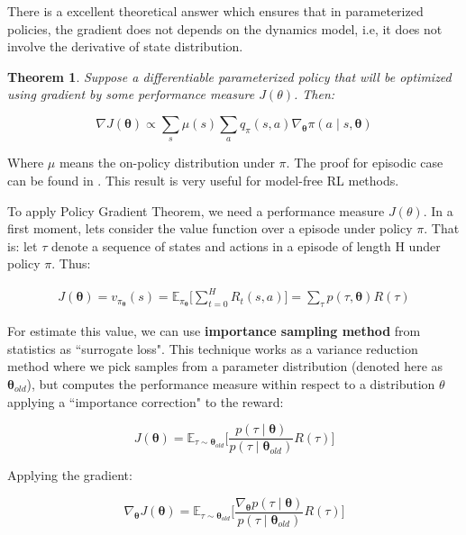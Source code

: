 There is a excellent theoretical answer which ensures that in parameterized policies, the gradient does not depends on the dynamics model, i.e, it does not involve the derivative of state distribution.

\newtheorem{pg}{Theorem}
\begin{pg}
	Suppose a differentiable parameterized policy that will be optimized using gradient by some performance measure $J(\theta)$. Then:
	
	\begin{equation}
	\nabla J(\boldsymbol{\theta}) \propto \sum_{s}\mu(s)\sum_{a} q_{\pi}(s, a)\nabla_{\boldsymbol{\theta}} \pi(a \mid s, \boldsymbol{\theta})
	\end{equation}
\end{pg}

Where $\mu$ means the on-policy distribution under $\pi$. The proof for episodic case can be found in \cite{sutton1998rli}. This result is very useful for model-free RL methods.

To apply Policy Gradient Theorem, we need a performance measure $J(\theta)$. In a first moment, lets consider the value function over a episode under policy $\pi$. That is: let $\tau$ denote a sequence of states and actions in a episode of length H under policy $\pi$. Thus:

\begin{align}
J(\boldsymbol{\theta})  = v_{\pi_{\boldsymbol{\theta}}}(s)
 = \mathbb{E}_{\pi_{\boldsymbol{\theta}}}\Bigg[ \sum_{t = 0}^{H}R_{t}(s, a) \Bigg] = \sum_{\tau} p(\tau, \boldsymbol{\theta}) R(\tau)
\end{align}

For estimate this value, we can use \textbf{importance sampling method} \cite{NIPS2010_3922} from statistics as ``surrogate loss". This technique works as a variance reduction method where we pick samples from a parameter distribution (denoted here as $\boldsymbol{\theta}_{old}$), but computes the performance measure within respect to a distribution $\theta$ applying a ``importance correction" to the reward:

\begin{equation}\label{eq:optloss1}
J(\boldsymbol{\theta}) = \mathbb{E}_{\tau \sim \boldsymbol{\theta}_{old}} \Bigg[\frac{p(\tau \mid \boldsymbol{\theta})}{p(\tau \mid \boldsymbol{\theta}_{old})}R(\tau) \Bigg]
\end{equation}

Applying the gradient:

\begin{equation}
\nabla_{\boldsymbol{\theta}} J(\boldsymbol{\theta}) = \mathbb{E}_{\tau \sim \boldsymbol{\theta}_{old}} \Bigg[\frac{\nabla_{\boldsymbol{\theta}} p(\tau \mid \boldsymbol{\theta})}{p(\tau \mid \boldsymbol{\theta}_{old})}R(\tau) \Bigg]
\end{equation}


